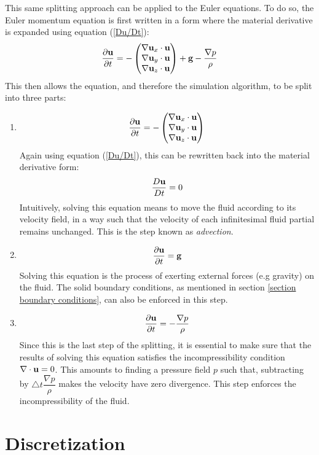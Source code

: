 This same splitting approach can be applied to the Euler equations. To do so, the Euler momentum equation is first written in a form where the material derivative is expanded using equation (\ref{Du/Dt}):
$$
\frac{\partial \textbf{u}}{\partial t}   =  -\begin{pmatrix}
    \nabla \textbf{u}_x  \cdot \textbf{u}\\
     \nabla \textbf{u}_y \cdot \textbf{u}\\
     \nabla \textbf{u}_z \cdot \textbf{u}
  \end{pmatrix}
  + \textbf{g}
  -\frac{\nabla p}{\rho} 
$$
This then allows the equation, and therefore the simulation algorithm, to be split into three parts:
\begin{enumerate}
    \item
    $$
    \frac{\partial \textbf{u}}{\partial t}   =  -\begin{pmatrix}
        \nabla \textbf{u}_x  \cdot \textbf{u}\\
         \nabla \textbf{u}_y \cdot \textbf{u}\\
         \nabla \textbf{u}_z \cdot \textbf{u}\end{pmatrix} 
    $$
    Again using equation (\ref{Du/Dt}), this can be rewritten back into the material derivative form:
    $$
    \dfrac{D\textbf{u}}{Dt} = 0
    $$
    Intuitively, solving this equation means to move the fluid according to its velocity field, in a way such that the velocity of each infinitesimal fluid partial remains unchanged. This is the step known as \textit{advection}. 

    \item
    $$
    \frac{\partial \textbf{u}}{\partial t}   = \textbf{g}
    $$
    Solving this equation is the process of exerting external forces (e.g gravity) on the fluid. The solid boundary conditions, as mentioned in section \ref{section boundary conditions}, can also be enforced in this step.

    \item
    $$
    \frac{\partial \textbf{u}}{\partial t}   = -\frac{\nabla p}{\rho} 
    $$
    Since this is the last step of the splitting, it is essential to make sure that the results of solving this equation satisfies the incompressibility condition $\nabla \cdot \textbf{u} = 0$. This amounts to finding a pressure field $p$ such that, subtracting by $\triangle t \dfrac{\nabla p}{\rho}$ makes the velocity have zero divergence. This step enforces the incompressibility of the fluid.

\end{enumerate}



\section{Discretization}

